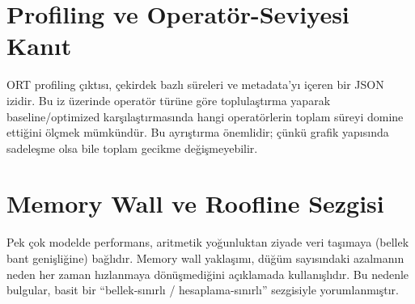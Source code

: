 \section{Profiling ve Operatör-Seviyesi Kanıt}
ORT profiling çıktısı, çekirdek bazlı süreleri ve metadata'yı içeren bir JSON izidir.
Bu iz üzerinde operatör türüne göre toplulaştırma yaparak baseline/optimized karşılaştırmasında hangi operatörlerin toplam süreyi domine ettiğini ölçmek mümkündür.
Bu ayrıştırma önemlidir; çünkü grafik yapısında sadeleşme olsa bile toplam gecikme değişmeyebilir.

\section{Memory Wall ve Roofline Sezgisi}
Pek çok modelde performans, aritmetik yoğunluktan ziyade veri taşımaya (bellek bant genişliğine) bağlıdır.
Memory wall \cite{memorywall} yaklaşımı, düğüm sayısındaki azalmanın neden her zaman hızlanmaya dönüşmediğini açıklamada kullanışlıdır.
Bu nedenle bulgular, basit bir “bellek-sınırlı / hesaplama-sınırlı” sezgisiyle yorumlanmıştır.